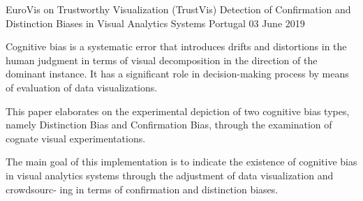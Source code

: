 

\begin{cventries}

  \cventry
    {EuroVis on Trustworthy Visualization (TrustVis)} %
    {Detection of Confirmation and Distinction Biases in Visual Analytics Systems} %
    {Portugal} %
    {03 June 2019} %
    {
      \begin{cvitems} %
        \item {Cognitive bias is a systematic error that introduces drifts and distortions in the human judgment in terms of visual decomposition in the direction of the dominant instance. It has a significant role in decision-making process by means of evaluation of data visualizations. }
        \item{ This paper elaborates on the experimental depiction of two cognitive bias types, namely Distinction Bias and Confirmation Bias, through the examination of cognate visual experimentations.}
        \item{The main goal of this implementation is to indicate the existence of cognitive bias in visual analytics systems through the adjustment of data visualization and crowdsourc- ing in terms of confirmation and distinction biases.}
      \end{cvitems}
    }

\end{cventries}

